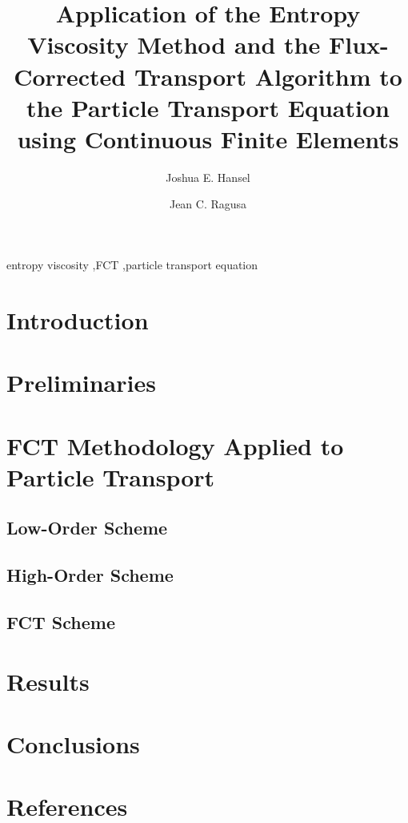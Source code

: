 \documentclass{elsarticle}
\newcommand{\tcr}[1]{\textcolor{red}{#1}}
\begin{document}
\begin{frontmatter}


\title{Application of the Entropy Viscosity Method and the Flux-Corrected Transport
  Algorithm to the Particle Transport Equation using Continuous Finite Elements}

\author[tamu]{Joshua E. Hansel}

\author[tamu]{Jean C. Ragusa}

\address[tamu]{Texas A\&M University,
  400 Bizzell St,
  College Station, TX 77840}



\begin{keyword}
entropy viscosity \sep FCT \sep particle transport equation
\end{keyword}

\end{frontmatter}

\section{Introduction\label{sec:introduction}}


\section{Preliminaries\label{sec:preliminaries}}


\section{FCT Methodology Applied to Particle Transport\label{sec:methodology}}

\subsection{Low-Order Scheme\label{sec:low}}

\subsection{High-Order Scheme\label{sec:high}}

\subsection{FCT Scheme\label{sec:fct}}


\section{Results\label{sec:results}}


\section{Conclusions\label{sec:conclusions}}


\section*{References}


\end{document}
